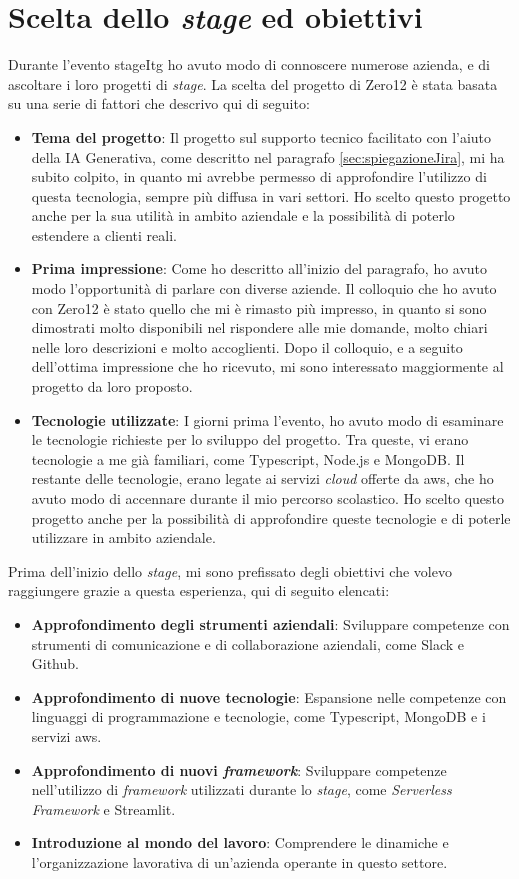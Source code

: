 \section{Scelta dello \textit{stage} ed obiettivi} \label{sec:sceltaStage}
Durante l'evento \gls{stageItg} ho avuto modo di connoscere numerose azienda, e di ascoltare i loro progetti di \textit{stage}. 
La scelta del progetto di Zero12 è stata basata su una serie di fattori che descrivo qui di seguito:
\begin{itemize}
    \item \textbf{Tema del progetto}: Il progetto sul supporto tecnico facilitato con l'aiuto della IA Generativa, come descritto nel paragrafo \ref{sec:spiegazioneJira}, mi ha subito colpito, in quanto mi avrebbe permesso di approfondire l'utilizzo di questa tecnologia, sempre più diffusa in vari settori. Ho scelto questo progetto anche per la sua utilità in ambito aziendale e la possibilità di poterlo estendere a clienti reali.
    \item \textbf{Prima impressione}: Come ho descritto all'inizio del paragrafo, ho avuto modo l'opportunità di parlare con diverse aziende. Il colloquio che ho avuto con Zero12 è stato quello che mi è rimasto più impresso, in quanto si sono dimostrati molto disponibili nel rispondere alle mie domande, molto chiari nelle loro descrizioni e molto accoglienti. Dopo il colloquio, e a seguito dell'ottima impressione che ho ricevuto, mi sono interessato maggiormente al progetto da loro proposto.
    \item \textbf{Tecnologie utilizzate}: I giorni prima l'evento, ho avuto modo di esaminare le tecnologie richieste per lo sviluppo del progetto. Tra queste, vi erano tecnologie a me già familiari, come Typescript, Node.js e MongoDB. Il restante delle tecnologie, erano legate ai servizi \textit{cloud} offerte da \gls{aws}, che ho avuto modo di accennare durante il mio percorso scolastico. Ho scelto questo progetto anche per la possibilità di approfondire queste tecnologie e di poterle utilizzare in ambito aziendale.
\end{itemize}
Prima dell'inizio dello \textit{stage}, mi sono prefissato degli obiettivi che volevo raggiungere grazie a questa esperienza, qui di seguito elencati:
\begin{itemize}
    \item \textbf{Approfondimento degli strumenti aziendali}: Sviluppare competenze con strumenti di comunicazione e di collaborazione aziendali, come Slack e Github.
    \item \textbf{Approfondimento di nuove tecnologie}: Espansione nelle competenze con linguaggi di programmazione e tecnologie, come Typescript, MongoDB e i servizi \gls{aws}.
    \item \textbf{Approfondimento di nuovi \textit{framework}}: Sviluppare competenze nell'utilizzo di \textit{framework} utilizzati durante lo \textit{stage}, come \textit{Serverless Framework} e Streamlit.
    \item \textbf{Introduzione al mondo del lavoro}: Comprendere le dinamiche e l'organizzazione lavorativa di un'azienda operante in questo settore.
\end{itemize}